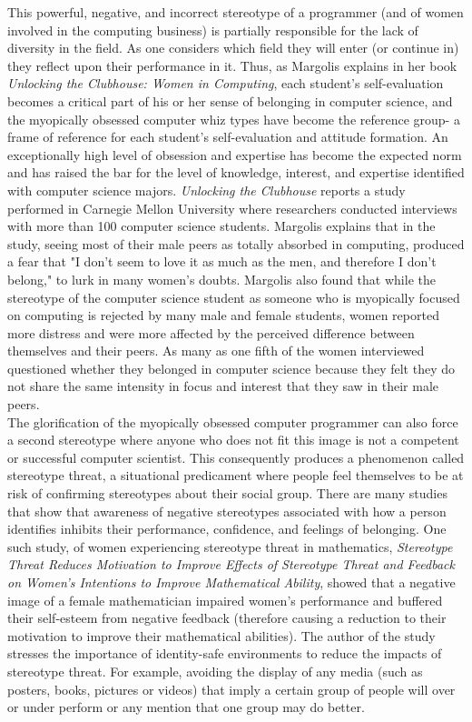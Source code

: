 \documentclass[12pt]{article}
\begin{document}
		This powerful, negative, and incorrect stereotype of a programmer (and of women involved in the computing business) is partially responsible for the lack of diversity in the field. As one considers which field they will enter (or continue in) they reflect upon their performance in it. Thus, as Margolis explains in her book \textit{Unlocking the Clubhouse: Women in Computing}, each student's self-evaluation becomes a critical part of his or her sense of belonging in computer science, and the myopically obsessed computer whiz types have become the reference group- a frame of reference for each student's self-evaluation and attitude formation. An exceptionally high level of obsession and expertise has become the expected norm and has raised the bar for the level of knowledge, interest, and expertise identified with computer science majors. \textit{Unlocking the Clubhouse} reports a study performed in Carnegie Mellon University where researchers conducted interviews with more than 100 computer science students. Margolis explains that in the study, seeing most of their male peers as totally absorbed in computing, produced a fear that "I don't seem to love it as much as the men, and therefore I don't belong," to lurk in many women's doubts\cite{margolis}.	Margolis also found that while the stereotype of the computer science student as someone who is myopically focused on computing is rejected by many male and female students, women reported more distress and were more affected by the perceived difference between themselves and their peers. As many as one fifth of the women interviewed questioned whether they belonged in computer science because they felt they do not share the same intensity in focus and interest that they saw in their male peers\cite{margolis}.\\
				
		The glorification of the myopically obsessed computer programmer can also force a second stereotype where anyone who does not fit this image is not a competent or successful computer scientist. This consequently produces a phenomenon called stereotype threat, a situational predicament where people feel themselves to be at risk of confirming stereotypes about their social group. There are many studies that show that awareness of negative stereotypes associated with how a person identifies inhibits their performance, confidence, and feelings of belonging. One such study, of women experiencing stereotype threat in mathematics, \textit{Stereotype Threat Reduces Motivation to Improve Effects of Stereotype Threat and Feedback on Women’s Intentions to Improve Mathematical Ability}, showed that a negative image of a female mathematician impaired women's performance and buffered their self-esteem from negative feedback (therefore causing a reduction to their motivation to improve their mathematical abilities)\cite{fogliati}. The author of the study stresses the importance of identity-safe environments to reduce the impacts of stereotype threat. For example, avoiding the display of any media (such as posters, books, pictures or videos) that imply a certain group of people will over or under perform or any mention that one group may do better. \\
		 
\end{document}
